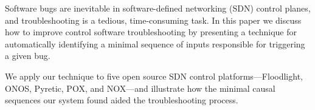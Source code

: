 Software bugs are inevitable in software-defined networking (SDN) control planes,
and troubleshooting
is a tedious, time-consuming task. In this paper we discuss how to improve
control software troubleshooting by presenting a technique
for automatically identifying
a minimal sequence of inputs responsible for triggering a given bug.

We apply our technique to five open source SDN control
platforms---Floodlight, ONOS, Pyretic, POX, and NOX---and
illustrate how the minimal causal sequences our system found aided the
troubleshooting process.
